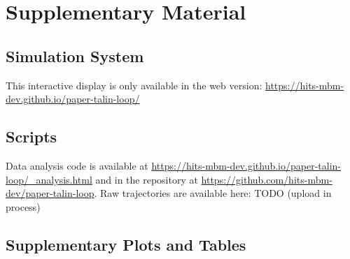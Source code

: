 \documentclass[
  twocolumn]{biophys-new-mod}
\begin{document}
\hypertarget{supplementary-material}{%
\section{Supplementary Material}\label{supplementary-material}}

\hypertarget{sec-system}{%
\subsection{Simulation System}\label{sec-system}}

\begin{tcolorbox}[enhanced jigsaw, arc=.35mm, colback=white, toprule=.15mm, rightrule=.15mm, bottomrule=.15mm, coltitle=black, opacitybacktitle=0.6, opacityback=0, colframe=quarto-callout-note-color-frame, breakable, titlerule=0mm, leftrule=.75mm, toptitle=1mm, bottomtitle=1mm, title=\textcolor{quarto-callout-note-color}{\faInfo}\hspace{0.5em}{Note}, left=2mm, colbacktitle=quarto-callout-note-color!10!white]
This interactive display is only available in the web version:
\url{https://hits-mbm-dev.github.io/paper-talin-loop/}
\end{tcolorbox}

\hypertarget{scripts}{%
\subsection{Scripts}\label{scripts}}

Data analysis code is available at
\url{https://hits-mbm-dev.github.io/paper-talin-loop/_analysis.html} and
in the repository at
\url{https://github.com/hits-mbm-dev/paper-talin-loop}. Raw trajectories
are available here: TODO (upload in process)

\hypertarget{supplementary-plots-and-tables}{%
\subsection{Supplementary Plots and
Tables}\label{supplementary-plots-and-tables}}
\end{document}
